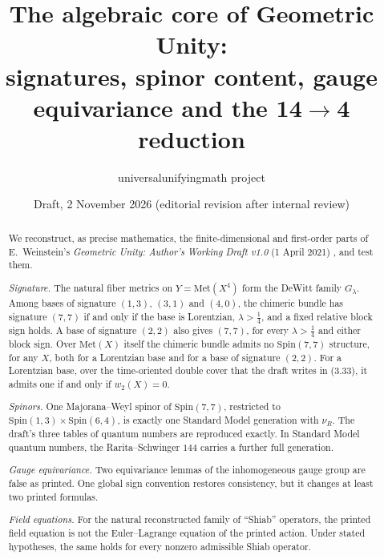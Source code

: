 \documentclass[11pt]{article}
\title{The algebraic core of Geometric Unity:\\ signatures, spinor content, gauge equivariance and the 14$\to$4 reduction}
\author{universalunifyingmath project}
\date{Draft, 2 November 2026 (editorial revision after internal review)}
\theoremstyle{remark}
\newcommand{\Met}{\mathrm{Met}}
\begin{document}
\maketitle

\begin{abstract}
We reconstruct, as precise mathematics, the finite-dimensional and first-order parts of E.~Weinstein's \emph{Geometric Unity: Author's Working Draft v1.0} (1 April 2021) \cite{W21}, and test them.

\emph{Signature.} The natural fiber metrics on $Y=\Met(X^4)$ form the DeWitt family $G_\lambda$. Among bases of signature $(1,3)$, $(3,1)$ and $(4,0)$, the chimeric bundle has signature $(7,7)$ if and only if the base is Lorentzian, $\lambda>\tfrac14$, and a fixed relative block sign holds. A base of signature $(2,2)$ also gives $(7,7)$, for every $\lambda>\tfrac14$ and either block sign. Over $\Met(X)$ itself the chimeric bundle admits no $\mathrm{Spin}(7,7)$ structure, for any $X$, both for a Lorentzian base and for a base of signature $(2,2)$. For a Lorentzian base, over the time-oriented double cover that the draft writes in (3.33), it admits one if and only if $w_2(X)=0$.

\emph{Spinors.} One Majorana--Weyl spinor of $\mathrm{Spin}(7,7)$, restricted to $\mathrm{Spin}(1,3)\times\mathrm{Spin}(6,4)$, is exactly one Standard Model generation with $\nu_R$. The draft's three tables of quantum numbers are reproduced exactly. In Standard Model quantum numbers, the Rarita--Schwinger $144$ carries a further full generation.

\emph{Gauge equivariance.} Two equivariance lemmas of the inhomogeneous gauge group are false as printed. One global sign convention restores consistency, but it changes at least two printed formulas.

\emph{Field equations.} For the natural reconstructed family of ``Shiab'' operators, the printed field equation is not the Euler--Lagrange equation of the printed action. Under stated hypotheses, the same holds for every nonzero admissible Shiab operator.


\end{abstract}
\end{document}
